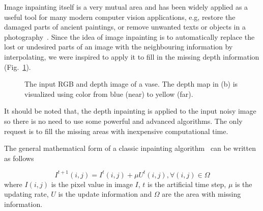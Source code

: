 Image inpainting itself is a very mutual area and has been widely applied as a useful tool for many modern computer vision applications, e.g, restore the damaged parts of ancient paintings, or remove unwanted texts or objects in a photography~\cite{bertalmio2000image}. 
Since the idea of image inpainting is to automatically replace the lost or undesired parts of an image with the neighbouring information by interpolating, we were inspired to apply it to fill in the missing depth information (Fig.~\ref{fig:inpainting1}).

\begin{figure}[!htbp]
\centering
{}
\caption{The input RGB and depth image of a vase. The depth map in (b) is visualized using color from blue (near) to yellow (far).}
\label{fig:inpainting1}
\end{figure}

It should be noted that, the depth inpainting is applied to the input noisy image so there is no need to use some powerful and advanced algorithms.
The only request is to fill the missing areas with inexpensive computational time.

The general mathematical form of a classic inpainting algorithm~\cite{bertalmio2000image} can be written as follows

\begin{equation}\label{eq:method_inpaint1}
I^{t+1}(i,j) = I^{t}(i,j) + \mu U^{t}(i,j), \forall(i,j)\in \Omega
\end{equation}
where $I(i,j)$ is the pixel value in image $I$, $t$ is the artificial time step, $\mu$ is the updating rate, $U$ is the update information and $\Omega$ are the area with missing information.

